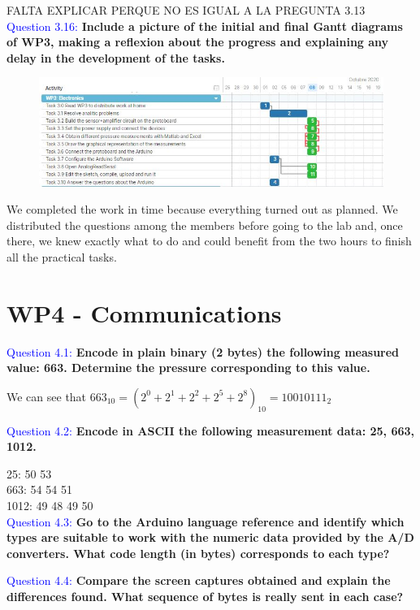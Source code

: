 \documentclass[12pt, a4papre]{article}
\begin{document}
	FALTA EXPLICAR PERQUE NO ES IGUAL A LA PREGUNTA 3.13\\

	\textcolor{blue}{Question 3.16:} \textbf{Include a picture of the initial and final Gantt diagrams of WP3, making a reflexion about the progress and explaining any delay in the development of the tasks. }
	
	\begin{figure}[H]
		\begin{center}
		\includegraphics[width=150mm]{WP3-8-10-2020.jpg}
		\end{center}
	\end{figure}
	
	We completed the work in time because everything turned out as planned. We distributed the questions among the members before going to the lab and, once there, we knew exactly what to do and could benefit from the two hours to finish all the practical tasks. 
	
	\section{WP4 - Communications}
	
	\textcolor{blue}{Question 4.1:} \textbf{Encode in plain binary (2 bytes) the following measured value: 663. Determine the pressure corresponding to this value.}
	
	We can see that $663_{10} = (2^0 + 2^1 + 2^2 + 2^5 + 2^8)_{10} = 10010111_2$

	\textcolor{blue}{Question 4.2:}  \textbf{Encode in ASCII the following measurement data: 25, 663, 1012.}
	
		25: 50 53\\
		663: 54 54 51\\
		1012: 49 48 49 50\\
	\textcolor{blue}{Question 4.3:} \textbf{Go to the Arduino language reference and identify which types are suitable to work with the numeric data provided by the A/D converters. What code length (in bytes) corresponds to each type?}

	\textcolor{blue}{Question 4.4:} \textbf{Compare the screen captures obtained and explain the differences found. What sequence of bytes is really sent in each case?}
\end{document}
